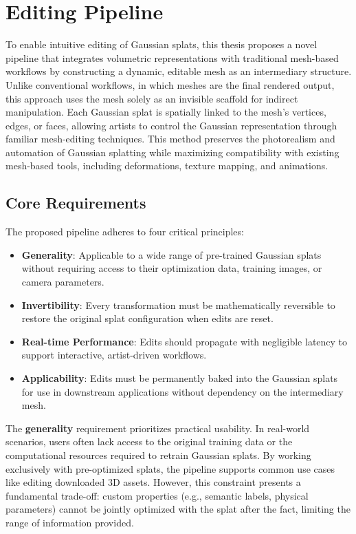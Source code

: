 \chapter{Editing Pipeline}

To enable intuitive editing of Gaussian splats, this thesis proposes a novel pipeline that integrates volumetric representations with traditional mesh-based workflows by constructing a dynamic, editable mesh as an intermediary structure. Unlike conventional workflows, in which meshes are the final rendered output, this approach uses the mesh solely as an invisible scaffold for indirect manipulation. Each Gaussian splat is spatially linked to the mesh's vertices, edges, or faces, allowing artists to control the Gaussian representation through familiar mesh-editing techniques. This method preserves the photorealism and automation of Gaussian splatting while maximizing compatibility with existing mesh-based tools, including deformations, texture mapping, and animations.

\section*{Core Requirements}
The proposed pipeline adheres to four critical principles:
\begin{itemize}
    \item \textbf{Generality}: Applicable to a wide range of pre-trained Gaussian splats without requiring access to their optimization data, training images, or camera parameters.
    \item \textbf{Invertibility}: Every transformation must be mathematically reversible to restore the original splat configuration when edits are reset.
    \item \textbf{Real-time Performance}: Edits should propagate with negligible latency to support interactive, artist-driven workflows.
    \item \textbf{Applicability}: Edits must be permanently baked into the Gaussian splats for use in downstream applications without dependency on the intermediary mesh.
\end{itemize}


The \textbf{generality} requirement prioritizes practical usability. In real-world scenarios, users often lack access to the original training data or the computational resources required to retrain Gaussian splats. By working exclusively with pre-optimized splats, the pipeline supports common use cases like editing downloaded 3D assets. However, this constraint presents a fundamental trade-off: custom properties (e.g., semantic labels, physical parameters) cannot be jointly optimized with the splat after the fact, limiting the range of information provided.

